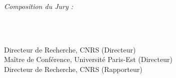 \begin{titlepage}
\begin{addmargin}[-1cm]{-3cm}
\begin{center}
\textit{Composition du Jury :}

\medskip


\begin{adjustwidth*}{-0.5cm}{-2cm}
\begin{minipage}{0.28\linewidth}
\raggedright
\textbf{}\\
\textbf{}\\
\textbf{}
\end{minipage}
\begin{minipage}{0.7\linewidth}
\raggedright
Directeur de Recherche, CNRS (Directeur)\\
Maître de Conférence, Université Paris-Est (Directeur)\\
Directeur de Recherche, CNRS (Rapporteur)
\end{minipage}
\end{adjustwidth*}

\vfill

\end{center}
\end{addmargin}

\end{titlepage}




